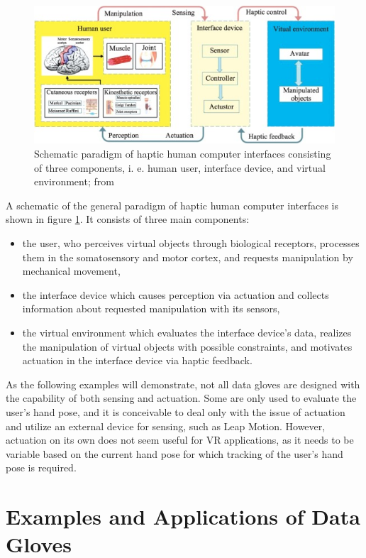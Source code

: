 \documentclass[hyperref, bachelorofscience]{cgvpub}
\begin{document}
\begin{figure}
	\centering
	\includegraphics[width=.8\linewidth]{../pics/wang01}
	\caption[Schematic paradigm of haptic human computer interfaces]{Schematic paradigm of haptic human computer interfaces consisting of three components, i. e. human user, interface device, and virtual environment; from \cite{wang19}}
	\label{fig:hci}
\end{figure}

A schematic of the general paradigm of haptic human computer interfaces is shown in figure \ref{fig:hci}. It consists of three main components:
\begin{itemize}
	\item the user, who perceives virtual objects through biological receptors, processes them in the somatosensory and motor cortex, and requests manipulation by mechanical movement,
	\item the interface device which causes perception via actuation and collects information about requested manipulation with its sensors,
	\item the virtual environment which evaluates the interface device's data, realizes the manipulation of virtual objects with possible constraints, and motivates actuation in the interface device via haptic feedback.
\end{itemize}

As the following examples will demonstrate, not all data gloves are designed with the capability of both sensing and actuation. Some are only used to evaluate the user's hand pose, and it is conceivable to deal only with the issue of actuation and utilize an external device for sensing, such as Leap Motion. However, actuation on its own does not seem useful for VR applications, as it needs to be variable based on the current hand pose for which tracking of the user's hand pose is required.

\section{Examples and Applications of Data Gloves} \label{sec:ex}
\end{document}
